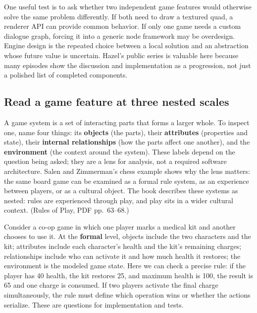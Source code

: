 One useful test is to ask whether two independent game features would otherwise solve the same problem differently. If both need to draw a textured quad, a renderer API can provide common behavior. If only one game needs a custom dialogue graph, forcing it into a generic node framework may be overdesign. Engine design is the repeated choice between a local solution and an abstraction whose future value is uncertain. Hazel's public series is valuable here because many episodes show the discussion and implementation as a progression, not just a polished list of completed components.

\subsection{Read a game feature at three nested scales}\label{05-engine-i-ch009-read-a-game-feature-at-three-nested-scales}

\hypertarget{05-engine-i-ch009-read-a-game-feature-at-three-nested-scales}{}

A game system is a set of interacting parts that forms a larger whole. To inspect one, name four things: its \textbf{objects} (the parts), their \textbf{attributes} (properties and state), their \textbf{internal relationships} (how the parts affect one another), and the \textbf{environment} (the context around the system). These labels depend on the question being asked; they are a lens for analysis, not a required software architecture. Salen and Zimmerman's chess example shows why the lens matters: the same board game can be examined as a formal rule system, as an experience between players, or as a cultural object. The book describes these systems as nested: rules are experienced through play, and play sits in a wider cultural context. (Rules of Play, PDF pp.~63--68.)

Consider a co-op game in which one player marks a medical kit and another chooses to use it. At the \textbf{formal} level, objects include the two characters and the kit; attributes include each character's health and the kit's remaining charges; relationships include who can activate it and how much health it restores; the environment is the modeled game state. Here we can check a precise rule: if the player has 40 health, the kit restores 25, and maximum health is 100, the result is 65 and one charge is consumed. If two players activate the final charge simultaneously, the rule must define which operation wins or whether the actions serialize. These are questions for implementation and tests.

